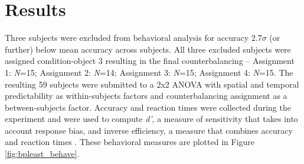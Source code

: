 \documentclass[dwyatte_dissertation.tex]{subfiles}
\begin{document}
\section{Results}
Three subjects were excluded from behavioral analysis for accuracy 2.7$\sigma$ (or further) below mean accuracy across subjects. All three excluded subjects were assigned condition-object 3 resulting in the final counterbalancing -- Assignment 1: \textit{N}=15; Assignment 2: \textit{N}=14; Assignment 3: \textit{N}=15; Assignment 4: \textit{N}=15. The resulting 59 subjects were submitted to a 2x2 ANOVA with spatial and temporal predictability as within-subjects factors and counterbalancing assignment as a between-subjects factor. Accuracy and reaction times were collected during the experiment and were used to compute \textit{d'}, a measure of sensitivity that takes into account response bias, and inverse efficiency, a measure that combines accuracy and reaction times \cite{TownshendAshby78,TownshendAshby83}. These behavioral measures are plotted in Figure \ref{fig:bpleast_behave}.
\end{document}
